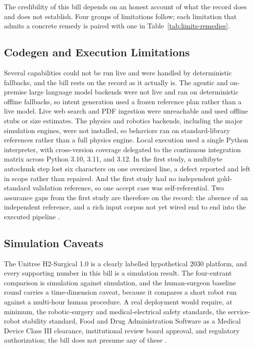 
The credibility of this bill depends on an honest account of what the record does
and does not establish. Four groups of limitations follow; each limitation that
admits a concrete remedy is paired with one in Table~\ref{tab:limits-remedies}.

\subsection{Codegen and Execution Limitations}

Several capabilities could not be run live and were handled by deterministic
fallbacks, and the bill rests on the record as it actually is. The agentic and
on-premise large language model backends were not live and ran on deterministic
offline fallbacks, so intent generation used a frozen reference plan rather than a
live model. Live web search and PDF ingestion were unreachable and used offline
stubs or size estimates. The physics and robotics backends, including the major
simulation engines, were not installed, so behaviors ran on standard-library
references rather than a full physics engine. Local execution used a single
Python interpreter, with cross-version coverage delegated to the continuous
integration matrix across Python 3.10, 3.11, and 3.12. In the first study, a
multibyte autochunk step lost six characters on one oversized line, a defect
reported and left in scope rather than repaired. And the first study had no
independent gold-standard validation reference, so one accept case was
self-referential. Two assurance gaps from the first study are therefore on the
record: the absence of an independent reference, and a rich input corpus not yet
wired end to end into the executed pipeline \cite{kawchak2026vvuq01,
kawchak2026vvuq02}.

\subsection{Simulation Caveats}

The Unitree H2-Surgical 1.0 is a clearly labelled hypothetical 2030 platform, and
every supporting number in this bill is a simulation result. The four-entrant
comparison is simulation against simulation, and the human-surgeon baseline round
carries a time-dimension caveat, because it compares a short robot run against a
multi-hour human procedure. A real deployment would require, at minimum, the
robotic-surgery and medical-electrical safety standards, the service-robot
stability standard, Food and Drug Administration Software as a Medical Device
Class III clearance, institutional review board approval, and regulatory
authorization; the bill does not presume any of these \cite{iec8060127, iec60601,
iso13482}.

